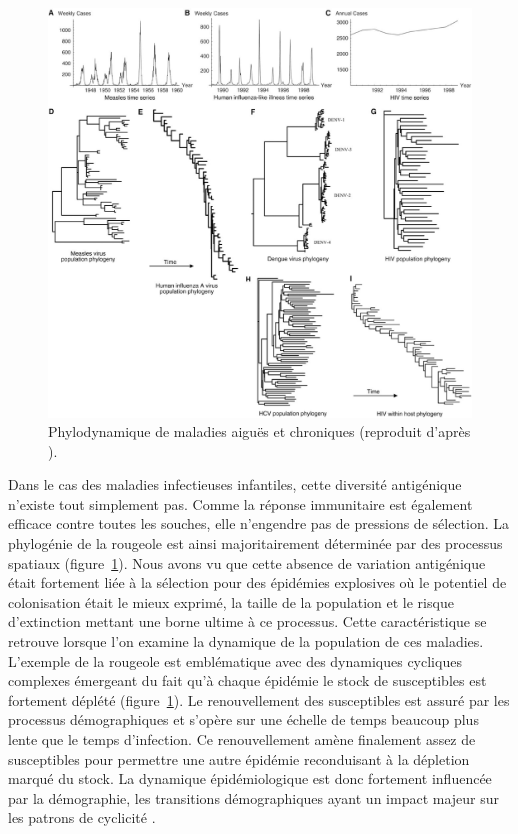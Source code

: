 \begin{figure}[!htbp]
  \begin{center}
    \includegraphics[width=0.9\linewidth]{graphs/intro/grenfell_2004.eps}
  \end{center}
  \caption{Phylodynamique de maladies aiguës et chroniques (reproduit
    d'après \citet{Grenfell2004}).}
  \label{fig:intro:multi}
\end{figure}

Dans le cas des maladies infectieuses infantiles, cette diversité
antigénique n'existe tout simplement pas. Comme la réponse immunitaire
est également efficace contre toutes les souches, elle n'engendre pas
de pressions de sélection. La phylogénie de la rougeole est ainsi
majoritairement déterminée par des processus spatiaux
(figure~\ref{fig:intro:multi}). Nous avons vu que cette absence de
variation antigénique était fortement liée à la sélection pour des
épidémies explosives où le potentiel de colonisation était le mieux
exprimé, la taille de la population et le risque d'extinction mettant
une borne ultime à ce processus. Cette caractéristique se retrouve
lorsque l'on examine la dynamique de la population de ces maladies.
L'exemple de la rougeole est emblématique avec des dynamiques
cycliques complexes émergeant du fait qu'à chaque épidémie le stock de
susceptibles est fortement déplété (figure~\ref{fig:intro:multi}). Le
renouvellement des susceptibles est assuré par les processus
démographiques et s'opère sur une échelle de temps beaucoup plus lente
que le temps d'infection. Ce renouvellement amène finalement assez de
susceptibles pour permettre une autre épidémie reconduisant à la
dépletion marqué du stock. La dynamique épidémiologique est donc
fortement influencée par la démographie, les transitions
démographiques ayant un impact majeur sur les patrons de cyclicité
\citep{Earn2000, Bauch2003, Alonso2007}.

